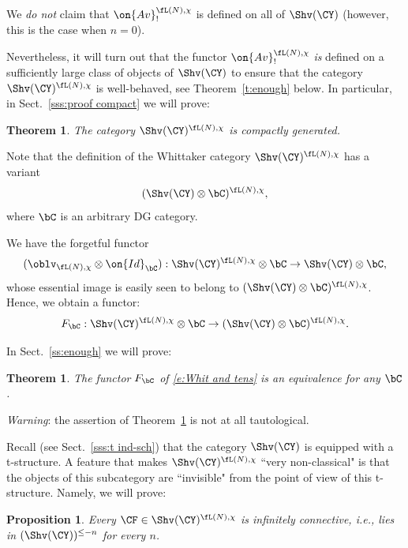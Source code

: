 \documentclass[9pt]{amsart}
\newtheorem{prop}[subsubsection]{Proposition}
\newtheorem{thm}[subsubsection]{Theorem}
\theoremstyle{definition}
\theoremstyle{remark}
\newcommand{\thmref}[1]{Theorem~\ref{#1}}
\newcommand{\secref}[1]{Sect.~\ref{#1}}
\numberwithin{equation}{section}
\begin{document}
\medskip

We \emph{do not} claim that $\on{Av}^{\fL(N),\chi}_!$ is defined on all of $\Shv(\CY)$
(however, this is the case when $n=0$).  

\medskip

Nevertheless, it will turn out
that the functor $\on{Av}^{\fL(N),\chi}_!$ \emph{is} defined on a sufficiently large class of objects
of $\Shv(\CY)$ to ensure that the category $\Shv(\CY)^{\fL(N),\chi}$ is well-behaved,
see \thmref{t:enough} below.  In particular, in \secref{sss:proof compact} we will prove:

\begin{thm}  \label{t:comp gen}
The category $\Shv(\CY)^{\fL(N),\chi}$ is compactly generated.
\end{thm}

\sssec{}

Note that the definition of the Whittaker category $\Shv(\CY)^{\fL(N),\chi}$ has a variant 
$$(\Shv(\CY)\otimes \bC)^{\fL(N),\chi},$$
where $\bC$ is an arbitrary DG category. 

\medskip

We have the forgetful functor
$$(\oblv_{\fL(N),\chi}\otimes \on{Id}_\bC):\Shv(\CY)^{\fL(N),\chi}\otimes \bC \to \Shv(\CY)\otimes \bC,$$
whose essential image is easily seen to belong to $(\Shv(\CY)\otimes \bC)^{\fL(N),\chi}$.
Hence, we obtain a functor:
\begin{equation} \label{e:Whit and tens}
F_\bC :\Shv(\CY)^{\fL(N),\chi}\otimes \bC\to (\Shv(\CY)\otimes \bC)^{\fL(N),\chi}.
\end{equation}

In \secref{ss:enough} we will prove:

\begin{thm}  \label{t:Whit and tens}
The functor $F_\bC$ of \eqref{e:Whit and tens} is an equivalence for any $\bC$.
\end{thm} 

\noindent \emph{Warning}: the assertion of \thmref{t:Whit and tens} is not at all tautological. 

\sssec{}

Recall (see \secref{sss:t ind-sch}) that the category $\Shv(\CY)$ is equipped with a t-structure. A feature that makes
$\Shv(\CY)^{\fL(N),\chi}$ ``very non-classical" is that the objects of this subcategory are ``invisible" from the point
of view of this t-structure. Namely, we will prove: 

\begin{prop} \label{p:invis}
Every $\CF\in \Shv(\CY)^{\fL(N),\chi}$ is \emph{infinitely connective}, i.e., lies in $(\Shv(\CY))^{\leq -n}$ for every $n$.
\end{prop}
\end{document}
